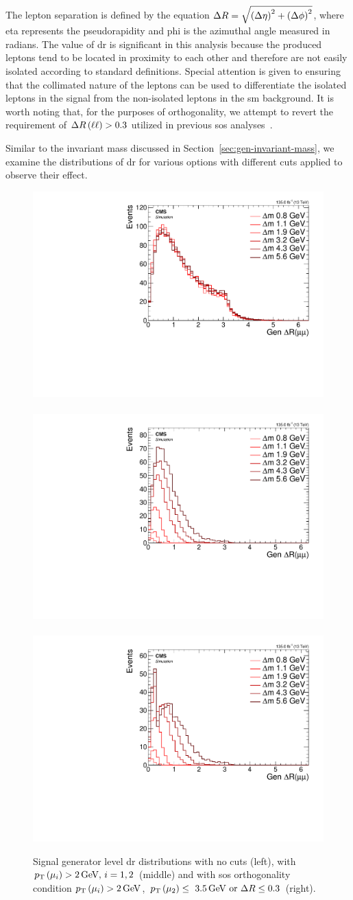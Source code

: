 The lepton separation is defined by the equation $\Delta R=\sqrt{\left(\Delta\eta\right)^2+\left(\Delta\phi\right)^2}$, where \gls{eta} represents the pseudorapidity and \gls{phi} is the azimuthal angle measured in radians. The value of \gls{dr} is significant in this analysis because the produced leptons tend to be located in proximity to each other and therefore are not easily isolated according to standard definitions. Special attention is given to ensuring that the collimated nature of the leptons can be used to differentiate the isolated leptons in the signal from the non-isolated leptons in the \gls{sm} background. It is worth noting that, for the purposes of orthogonality, we attempt to revert the requirement of $\Delta R\left(\ell\ell\right) > 0.3$ utilized in previous \gls{sos} analyses~\citep{sos}.

Similar to the invariant mass discussed in Section~\ref{sec:gen-invariant-mass}, we examine the distributions of \gls{dr} for various \dm options with different cuts applied to observe their effect.

\begin{figure}[!htb]
\centering
\includegraphics[width=0.32\linewidth]{plots/signal_muons_gen/none_gen_deltaR.pdf} \,
\includegraphics[width=0.32\linewidth]{plots/signal_muons_gen/none_gen_deltaR_cut.pdf}  \,
\includegraphics[width=0.32\linewidth]{plots/signal_muons_gen/none_gen_deltaR_orth.pdf} \\
\caption[Signal generator level \DR distributions]{ Signal generator level \gls{dr} distributions with no cuts (left), with $p_{\mathrm{T}}\left(\mu_i\right)>2\,\text{Ge\hspace{-.08em}V},\,i=1,2$ (middle) and with \gls{sos} orthogonality condition $p_{\mathrm{T}}\left(\mu_i\right)>2\,\text{Ge\hspace{-.08em}V}$, $p_{\mathrm{T}}\left(\mu_2\right)\leq~3.5\,\text{Ge\hspace{-.08em}V}\text{ or }\Delta R\leq 0.3$ (right).}
\label{fig:signal-generator-dr}
\end{figure}

